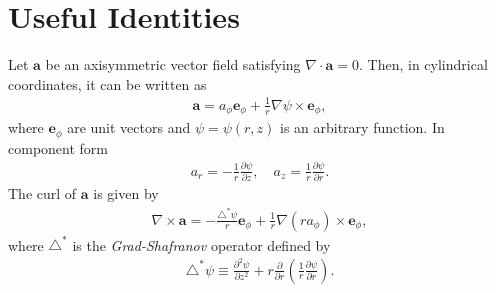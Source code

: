 \documentclass[11pt, reqno]{amsart}
\newcommand{\pfrac}[2]{\frac{\partial #1}{\partial #2}}
\newcommand{\mvec}[1]{\mathbf{#1}}
\newcommand{\eep}{\mvec{e}_\phi}
\theoremstyle{definition}
\begin{document}
\appendix

\section{Useful Identities}
\label{apdx:identities}

Let $\mvec{a}$ be an axisymmetric vector field satisfying
$\nabla\cdot\mvec{a} = 0$. Then, in cylindrical coordinates, it can be
written as
\begin{align}
  \mvec{a} = a_\phi \eep + \frac{1}{r}\nabla\psi \times \eep, \label{id:divA}
\end{align}
where $\eep$ are unit vectors and $\psi = \psi(r,z)$ is an arbitrary
function. In component form
\begin{align}
  a_r = -\frac{1}{r} \pfrac{\psi}{z}, \quad 
  a_z = \frac{1}{r} \pfrac{\psi}{r}.
\end{align}
The curl of $\mvec{a}$ is given by
\begin{align}
  \nabla\times\mvec{a} = -\frac{\triangle^*\psi}{r}\eep
  + \frac{1}{r} \nabla(ra_\phi)\times\eep, \label{eq:curla}
\end{align}
where $\triangle^*$ is the \emph{Grad-Shafranov} operator defined by
\begin{align}
  \triangle^*\psi \equiv \frac{\partial^2 \psi}{\partial z^2}
  + r \frac{\partial}{\partial r}\left(\frac{1}{r} \pfrac{\psi}{r}\right).
\end{align}
\end{document}
